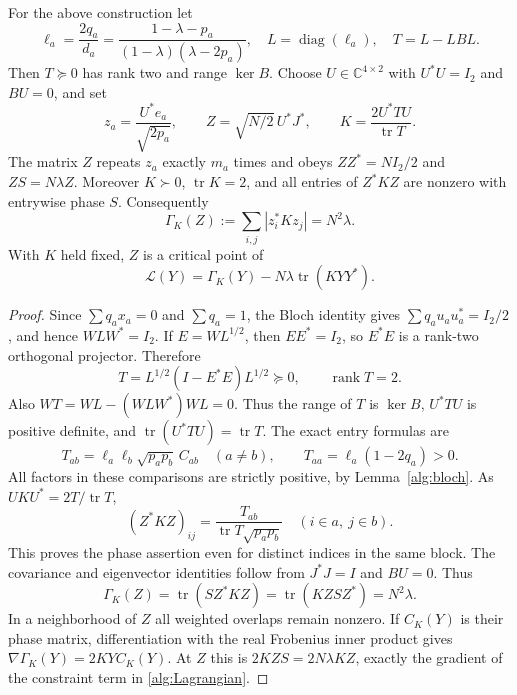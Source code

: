 \begin{proposition}
\label{alg:stress}
For the above construction let
\begin{equation}\label{alg:stress-def}
 \ell_a=\frac{2q_a}{d_a}
 =\frac{1-\lambda-p_a}{(1-\lambda)(\lambda-2p_a)},\quad
 L=\operatorname{diag}(\ell_a),\quad T=L-LBL.
\end{equation}
Then $T\succeq0$ has rank two and range $\ker B$.
Choose $U\in\mathbb C^{4\times2}$ with $U^*U=I_2$ and $BU=0$, and set
\begin{equation}\label{alg:Z-K}
 z_a=\frac{U^*e_a}{\sqrt{2p_a}},\qquad
 Z=\sqrt{N/2}\,U^*J^*,\qquad K=\frac{2U^*TU}{\operatorname{tr}T}.
\end{equation}
The matrix $Z$ repeats $z_a$ exactly $m_a$ times and obeys
$ZZ^*=NI_2/2$ and $ZS=N\lambda Z$. Moreover $K\succ0$,
$\operatorname{tr}K=2$, and all entries of $Z^*KZ$ are nonzero with
entrywise phase $S$. Consequently
\begin{equation}\label{alg:candidate-value}
 \Gamma_K(Z):=\sum_{i,j}|z_i^*Kz_j|=N^2\lambda.
\end{equation}
With $K$ held fixed, $Z$ is a critical point of
\begin{equation}\label{alg:Lagrangian}
 \mathcal L(Y)=\Gamma_K(Y)-N\lambda\operatorname{tr}(KYY^*).
\end{equation}
\end{proposition}
\begin{proof}
Since $\sum q_ax_a=0$ and $\sum q_a=1$, the Bloch identity gives
$\sum q_au_au_a^*=I_2/2$, and hence $WLW^*=I_2$.
If $E=WL^{1/2}$, then $EE^*=I_2$, so $E^*E$ is a rank-two orthogonal
projector. Therefore
\[
 T=L^{1/2}(I-E^*E)L^{1/2}\succeq0,\qquad\operatorname{rank}T=2.
\]
Also $WT=WL-(WLW^*)WL=0$. Thus the range of $T$ is $\ker B$,
$U^*TU$ is positive definite, and $\operatorname{tr}(U^*TU)=\operatorname{tr}T$.
The exact entry formulas are
\[
 T_{ab}=\ell_a\ell_b\sqrt{p_ap_b}\,C_{ab}\quad(a\ne b),\qquad
 T_{aa}=\ell_a(1-2q_a)>0.
\]
All factors in these comparisons are strictly positive, by
Lemma~\ref{alg:bloch}. As $UKU^*=2T/\operatorname{tr}T$,
\[
 (Z^*KZ)_{ij}=\frac{T_{ab}}{\operatorname{tr}T\sqrt{p_ap_b}}
       \quad(i\in a,\ j\in b).
\]
This proves the phase assertion even for distinct indices in the same
block. The covariance and eigenvector identities follow from
$J^*J=I$ and $BU=0$. Thus
\[
 \Gamma_K(Z)=\operatorname{tr}(S Z^*KZ)
 =\operatorname{tr}(KZSZ^*)=N^2\lambda.
\]
In a neighborhood of $Z$ all weighted overlaps remain nonzero.
If $C_K(Y)$ is their phase matrix, differentiation with the real
Frobenius inner product gives $\nabla\Gamma_K(Y)=2KYC_K(Y)$.
At $Z$ this is $2KZS=2N\lambda KZ$, exactly the gradient of the
constraint term in \eqref{alg:Lagrangian}.
\end{proof}

